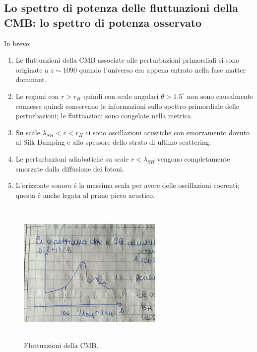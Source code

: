\documentclass[12pt, a4paper]{article}
\begin{document}
\subsection{Lo spettro di potenza delle fluttuazioni della CMB: lo spettro di potenza osservato
}
In breve:
\begin{enumerate}
 \item  Le fluttuazioni della CMB associate alle perturbazioni primordiali si sono originate a $z\sim 1090$ quando l'universo era appena entrato nella fase matter dominant.
\item Le regioni con $r>r_{H}$ quindi con scale angolari $\theta>1.5^{\circ}$ non sono causalmente connesse quindi conservano le informazioni sullo spettro primordiale delle perturbazioni; le fluttuazioni sono congelate nella metrica.
\item Su scale $\lambda_{SH}<r<r_H$ ci sono oscillazioni acustiche con smorzamento dovuto al Silk Damping e allo spessore dello strato di ultimo scattering.
\item Le perturbazioni adiabatiche su scale $r<\lambda_{SH}$ vengono completamente smorzate dalla diffusione dei fotoni.
\item L'orizzonte sonoro \'{e} la massima scala per avere delle oscillazioni coerenti; questa \'{e} anche legata al primo picco acustico.
 \end{enumerate}
\begin{figure}[htp]
\centering
\includegraphics[width=7cm, height=7cm]{images/cmbfluc.jpeg}
\caption{Fluttuazioni della CMB.}
\label{fig:cmbfluc}
\end{figure}
\end{document}
